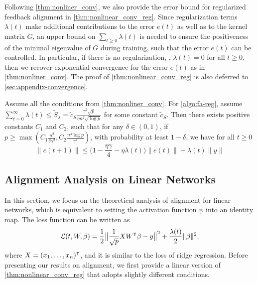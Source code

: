 Following \cref{thm:nonliner_conv}, we also provide the error bound for regularized feedback alignment in \cref{thm:nonlinear_conv_reg}. Since regularization terms $\lambda(t)$ make additional contributions to the error $e(t)$ as well as to the kernel matrix $G$, an upper bound on $\sum_{t\geq 0}\lambda(t)$ is needed to ensure the positiveness of the minimal eigenvalue of $G$ during training, such that the error $e(t)$ can be controlled. In particular, if there is no regularization, \ie, $\lambda(t)=0$ for all $t\geq 0$, then we recover exponential convergence for the error $e(t)$ as in \cref{thm:nonliner_conv}. The proof of \cref{thm:nonlinear_conv_reg} is also deferred to \cref{sec:appendix-convergence}.

\begin{theorem}
\label{thm:nonlinear_conv_reg}
Assume all the conditions from \cref{thm:nonliner_conv}. For \cref{algo:fa-reg}, assume $\sum_{t=0}^\infty \lambda(t) \leq  \tilde{S}_\lambda = \tilde{c}_{S}\frac{\gamma^2\sqrt{p}}{\eta n^2\sqrt{\log p}}$ for some constant $\tilde{c}_{S}$. Then there exists positive constants $C_1$ and $C_2$, such that for any $\delta\in(0,1)$, if $p \geq \max(C_1\frac{n^2}{\delta\gamma^2}, C_2\frac{n^4\log p}{\gamma^4})$, with probability at least $1-\delta$, we have for all $t\geq 0$
\begin{equation}
\label{eq:conv_reg}
    \|e(t+1)\| \leq \big(1-\frac{\eta\gamma}{4}-\eta\lambda(t)\big)\|e(t)\|+\lambda(t)\|y\|
\end{equation}
\end{theorem}



\subsection{Alignment Analysis on Linear Networks}
In this section, we focus on the theoretical analysis of alignment for linear networks, which is equivalent to setting the activation function $\psi$ into an identity map. The loss function can be written as
\begin{equation*}
    \Loss(t,W,\beta) = \frac{1}{2}\big\|\frac{1}{\sqrt{p}}XW\transpose\beta-y\big\|^2+\frac{\lambda(t)}{2}\|\beta\|^2,
\end{equation*}
where $X = (x_1,\ldots,x_n)\transpose$, and it is similar to the loss of ridge regression.
Before presenting our results on alignment, we first provide a linear version of \cref{thm:nonlinear_conv_reg} that adopts slightly different conditions.


